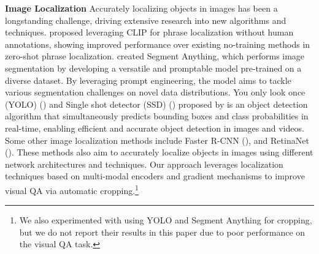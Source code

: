 \textbf{Image Localization}
Accurately localizing objects in images has been a longstanding challenge, driving extensive research into new algorithms and techniques. \cite{clip_localization1} proposed leveraging CLIP for phrase localization without human annotations, showing improved performance over existing no-training methods in zero-shot phrase localization. \cite{kirillov2023segment} created Segment Anything, which performs image segmentation by developing a versatile and promptable model pre-trained on a diverse dataset. By leveraging prompt engineering, the model aims to tackle various segmentation challenges on novel data distributions. You only look once (YOLO) (\cite{yolo}) and Single shot detector (SSD) (\cite{ssd}) proposed by is an object detection algorithm that simultaneously predicts bounding boxes and class probabilities in real-time, enabling efficient and accurate object detection in images and videos. Some other image localization methods include Faster R-CNN (\cite{faster-rcnn}), 
and RetinaNet (\cite{retinanet}). These methods also aim to accurately localize objects in images using different network architectures and techniques. Our approach leverages localization techniques based on multi-modal encoders and gradient mechanisms to improve visual QA via automatic cropping.\footnote{\scriptsize We also experimented with using YOLO and Segment Anything for cropping, but we do not report their results in this paper due to poor performance on the visual QA task.} %

